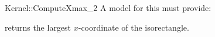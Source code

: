 \begin{ccRefFunctionObjectConcept}{Kernel::ComputeXmax_2}
A model for this must provide:


       {returns the largest $x$-coordinate of the isorectangle.}


\ccRefines
{}



\end{ccRefFunctionObjectConcept}

